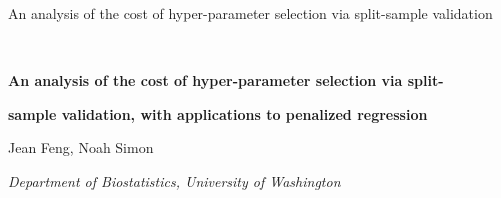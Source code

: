 \documentclass[12pt]{article} %
\theoremstyle{definition}
\begin{document}

\renewcommand{\baselinestretch}{2}


{\hfill {\footnotesize\rm An analysis of the cost of hyper-parameter selection via split-sample validation} \hfill}

\renewcommand{\thefootnote}{}
$\ $\par


\fontsize{12}{14pt plus.8pt minus .6pt}\selectfont \vspace{0.8pc}
\centerline{\large\bf An analysis of the cost of hyper-parameter selection via split-}
\vspace{2pt} \centerline{\large\bf sample validation, with applications to penalized regression}
\vspace{.4cm} \centerline{Jean Feng, Noah Simon} \vspace{.4cm} \centerline{\it
Department of Biostatistics, University of Washington} \vspace{.55cm} \fontsize{9}{11.5pt plus.8pt minus
.6pt}\selectfont

\end{document}
